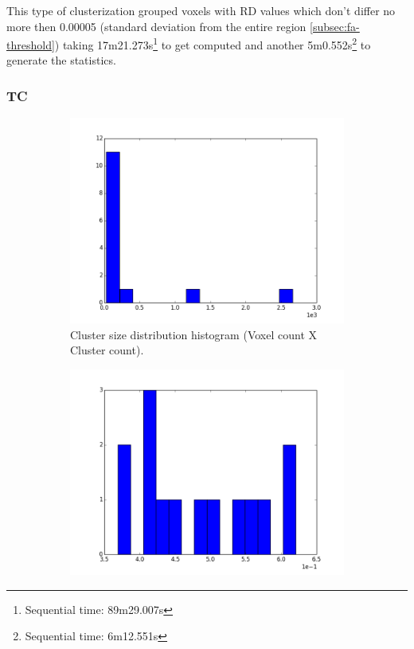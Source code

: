 \documentclass[a4paper,11pt]{report}
\begin{document}
    This type of clusterization grouped voxels with RD values which don't differ no more then 0.00005 (standard deviation from the entire region \ref{subsec:fa-threshold}) taking 17m21.273s\footnote{Sequential time: 89m29.007s} to get computed and another 5m0.552s\footnote{Sequential time: 6m12.551s} to generate the statistics.

    \newpage
    \subsubsection{TC}
    \begin{figure}[!ht]
      \centering

      \begin{subfigure}[t]{.49\textwidth}
        \includegraphics[width=1\linewidth]{img/histograms/tc_clustered_fa_mask_region_sizes_hist.png}
        \caption{Cluster size distribution histogram (Voxel count X Cluster count).}
        \label{subfig:fa_hist_region}
      \end{subfigure}\hfill%
      \begin{subfigure}[t]{.49\textwidth}
        \includegraphics[width=1\linewidth]{img/histograms/tc_clustered_fa_mask_fa_means_hist.png}

\end{subfigure}
\end{figure}
\end{document}
